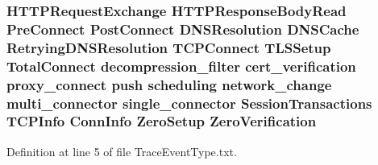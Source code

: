 \subsubsection[{Zero\+Verification}]{ H\+T\+T\+P\+Request\+Exchange H\+T\+T\+P\+Response\+Body\+Read {\bf Pre\+Connect} {\bf Post\+Connect} D\+N\+S\+Resolution D\+N\+S\+Cache Retrying\+D\+N\+S\+Resolution T\+C\+P\+Connect T\+L\+S\+Setup {\bf Total\+Connect} decompression\+\_\+filter cert\+\_\+verification proxy\+\_\+connect push scheduling network\+\_\+change multi\+\_\+connector single\+\_\+connector {\bf Session\+Transactions} {\bf T\+C\+P\+Info} {\bf Conn\+Info} {\bf Zero\+Setup} Zero\+Verification}\label{TraceEventType_8txt_a38f9a820daccc216c644655b9a4f87a7}


Definition at line 5 of file Trace\+Event\+Type.\+txt.

